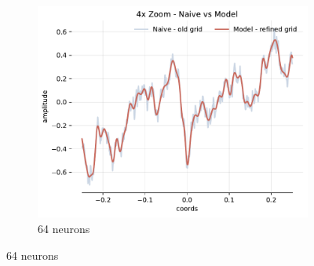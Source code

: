 \begin{figure}[!h]
\begin{subfigure}[b]{0.32\textwidth}
        \centering
        \includegraphics[width=\textwidth]{img/ch4/4x-zoom-noise-1hl-64hf-w8.pdf}
        \caption{64 neurons}
        \label{fig:4x-zoom-pred-noise-1hl-64hf-w8}
    \end{subfigure}


\end{figure}
